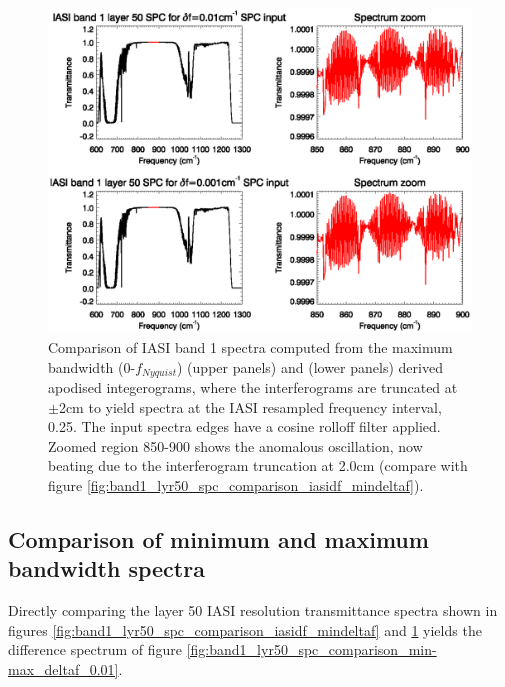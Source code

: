 \begin{figure}[htp]
  \centering
  \includegraphics[scale=0.8]{graphics/band1_lyr50_spc_comparison_iasidf_maxdeltaf.eps}
  \caption{Comparison of IASI band 1 spectra computed from the maximum bandwidth (0-$f_{Nyquist}${\invcm})  (upper panels) and  (lower panels) derived apodised integerograms, where the interferograms are truncated at $\pm$2cm to yield spectra at the IASI resampled frequency interval, 0.25\invcm. The input spectra edges have a cosine rolloff filter applied. Zoomed region 850-900{\invcm} shows the anomalous oscillation, now beating due to the interferogram truncation at 2.0cm (compare with figure \ref{fig:band1_lyr50_spc_comparison_iasidf_mindeltaf}).}
  \label{fig:band1_lyr50_spc_comparison_iasidf_maxdeltaf}
\end{figure}


\subsection{Comparison of minimum and maximum bandwidth spectra}
Directly comparing the layer 50 IASI resolution transmittance spectra shown in figures \ref{fig:band1_lyr50_spc_comparison_iasidf_mindeltaf} and \ref{fig:band1_lyr50_spc_comparison_iasidf_maxdeltaf} yields the difference spectrum of figure \ref{fig:band1_lyr50_spc_comparison_min-max_deltaf_0.01}.

